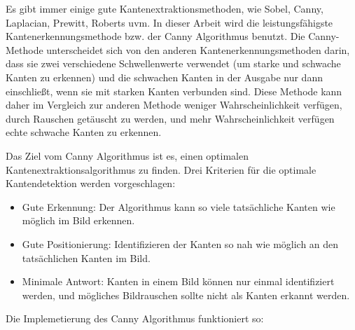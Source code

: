 Es gibt immer einige gute Kantenextraktionsmethoden, wie Sobel, Canny, Laplacian, Prewitt, Roberts uvm. In dieser Arbeit wird die leistungsfähigste Kantenerkennungsmethode bzw. der Canny Algorithmus benutzt. Die Canny-Methode unterscheidet sich von den anderen Kantenerkennungsmethoden darin, dass sie zwei verschiedene Schwellenwerte verwendet (um starke und schwache Kanten zu erkennen) und die schwachen Kanten in der Ausgabe nur dann einschließt, wenn sie mit starken Kanten verbunden sind. Diese Methode kann daher im Vergleich zur anderen Methode weniger Wahrscheinlichkeit verfügen, durch Rauschen getäuscht zu werden, und mehr Wahrscheinlichkeit verfügen echte schwache Kanten zu erkennen.

Das Ziel vom Canny Algorithmus ist es, einen optimalen Kantenextraktionsalgorithmus zu finden. Drei Kriterien für die optimale Kantendetektion werden vorgeschlagen:

\begin{itemize}

\item Gute Erkennung: Der Algorithmus kann so viele tatsächliche Kanten wie möglich im Bild erkennen.
\item Gute Positionierung: Identifizieren der Kanten so nah wie möglich an den tatsächlichen Kanten im Bild.
\item Minimale Antwort: Kanten in einem Bild können nur einmal identifiziert werden, und mögliches Bildrauschen sollte nicht als Kanten erkannt werden.

\end{itemize}

Die Implemetierung des Canny Algorithmus funktioniert so:


